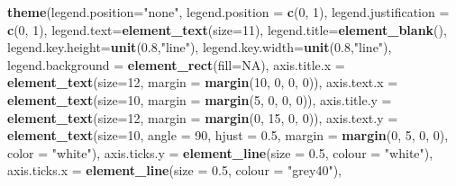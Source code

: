 \documentclass[]{article}
\newenvironment{Shaded}{\begin{snugshade}}{\end{snugshade}}
\newcommand{\KeywordTok}[1]{\textcolor[rgb]{0.13,0.29,0.53}{\textbf{{#1}}}}
\newcommand{\DataTypeTok}[1]{\textcolor[rgb]{0.13,0.29,0.53}{{#1}}}
\newcommand{\DecValTok}[1]{\textcolor[rgb]{0.00,0.00,0.81}{{#1}}}
\newcommand{\FloatTok}[1]{\textcolor[rgb]{0.00,0.00,0.81}{{#1}}}
\newcommand{\StringTok}[1]{\textcolor[rgb]{0.31,0.60,0.02}{{#1}}}
\newcommand{\OtherTok}[1]{\textcolor[rgb]{0.56,0.35,0.01}{{#1}}}
\newcommand{\NormalTok}[1]{{#1}}
\begin{document}
\begin{Shaded}
\begin{Highlighting}[]
\StringTok{  }\KeywordTok{theme}\NormalTok{(}\DataTypeTok{legend.position=}\StringTok{"none"}\NormalTok{,}
        \DataTypeTok{legend.position =} \KeywordTok{c}\NormalTok{(}\DecValTok{0}\NormalTok{, }\DecValTok{1}\NormalTok{), }
        \DataTypeTok{legend.justification =} \KeywordTok{c}\NormalTok{(}\DecValTok{0}\NormalTok{, }\DecValTok{1}\NormalTok{),}
        \DataTypeTok{legend.text=}\KeywordTok{element_text}\NormalTok{(}\DataTypeTok{size=}\DecValTok{11}\NormalTok{),}
        \DataTypeTok{legend.title=}\KeywordTok{element_blank}\NormalTok{(),}
        \DataTypeTok{legend.key.height=}\KeywordTok{unit}\NormalTok{(}\FloatTok{0.8}\NormalTok{,}\StringTok{"line"}\NormalTok{),}
        \DataTypeTok{legend.key.width=}\KeywordTok{unit}\NormalTok{(}\FloatTok{0.8}\NormalTok{,}\StringTok{"line"}\NormalTok{),}
        \DataTypeTok{legend.background =} \KeywordTok{element_rect}\NormalTok{(}\DataTypeTok{fill=}\OtherTok{NA}\NormalTok{),}
        \DataTypeTok{axis.title.x =} \KeywordTok{element_text}\NormalTok{(}\DataTypeTok{size=}\DecValTok{12}\NormalTok{, }\DataTypeTok{margin =} \KeywordTok{margin}\NormalTok{(}\DecValTok{10}\NormalTok{, }\DecValTok{0}\NormalTok{, }\DecValTok{0}\NormalTok{, }\DecValTok{0}\NormalTok{)),}
        \DataTypeTok{axis.text.x  =} \KeywordTok{element_text}\NormalTok{(}\DataTypeTok{size=}\DecValTok{10}\NormalTok{, }\DataTypeTok{margin =} \KeywordTok{margin}\NormalTok{(}\DecValTok{5}\NormalTok{, }\DecValTok{0}\NormalTok{, }\DecValTok{0}\NormalTok{, }\DecValTok{0}\NormalTok{)), }
        \DataTypeTok{axis.title.y =} \KeywordTok{element_text}\NormalTok{(}\DataTypeTok{size=}\DecValTok{12}\NormalTok{, }\DataTypeTok{margin =} \KeywordTok{margin}\NormalTok{(}\DecValTok{0}\NormalTok{, }\DecValTok{15}\NormalTok{, }\DecValTok{0}\NormalTok{, }\DecValTok{0}\NormalTok{)),}
        \DataTypeTok{axis.text.y  =} \KeywordTok{element_text}\NormalTok{(}\DataTypeTok{size=}\DecValTok{10}\NormalTok{, }\DataTypeTok{angle =} \DecValTok{90}\NormalTok{, }\DataTypeTok{hjust =} \FloatTok{0.5}\NormalTok{, }
                                    \DataTypeTok{margin =} \KeywordTok{margin}\NormalTok{(}\DecValTok{0}\NormalTok{, }\DecValTok{5}\NormalTok{, }\DecValTok{0}\NormalTok{, }\DecValTok{0}\NormalTok{), }\DataTypeTok{color =} \StringTok{"white"}\NormalTok{),}
        \DataTypeTok{axis.ticks.y =} \KeywordTok{element_line}\NormalTok{(}\DataTypeTok{size =} \FloatTok{0.5}\NormalTok{, }\DataTypeTok{colour =} \StringTok{"white"}\NormalTok{),}
        \DataTypeTok{axis.ticks.x =} \KeywordTok{element_line}\NormalTok{(}\DataTypeTok{size =} \FloatTok{0.5}\NormalTok{, }\DataTypeTok{colour =} \StringTok{"grey40"}\NormalTok{),}

\end{Highlighting}
\end{Shaded}
\end{document}
